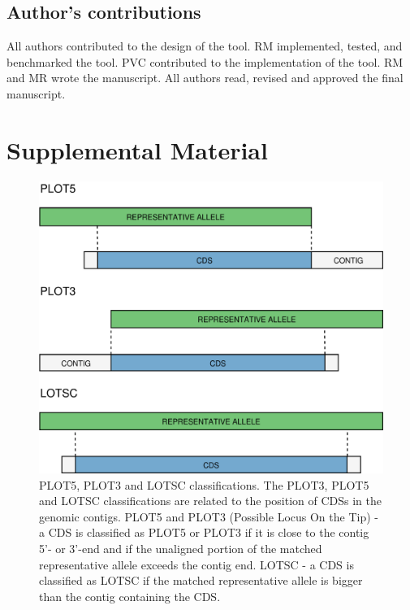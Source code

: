 \subsection{Author’s contributions} \label{ssec:declarations_ssec6}

All authors contributed to the design of the tool. RM implemented, tested, and benchmarked the tool. PVC contributed to the implementation of the tool. RM and MR wrote the manuscript. All authors read, revised and approved the final manuscript.




\newpage

\section{Supplemental Material}

\begin{figure}[h!]
    \centering
    \includegraphics[angle=0,width=\textwidth]{figures/chapter 2/FigureS1.pdf}
    \caption{PLOT5, PLOT3 and LOTSC classifications. The PLOT3, PLOT5 and LOTSC classifications are related to the position of CDSs in the genomic contigs. PLOT5 and PLOT3 (Possible Locus On the Tip) - a CDS is classified as PLOT5 or PLOT3 if it is close to the contig 5’- or 3’-end and if the unaligned portion of the matched representative allele exceeds the contig end. LOTSC - a CDS is classified as LOTSC if the matched representative allele is bigger than the contig containing the CDS.}
    \label{fig:chap2_figureS1}
\end{figure}

